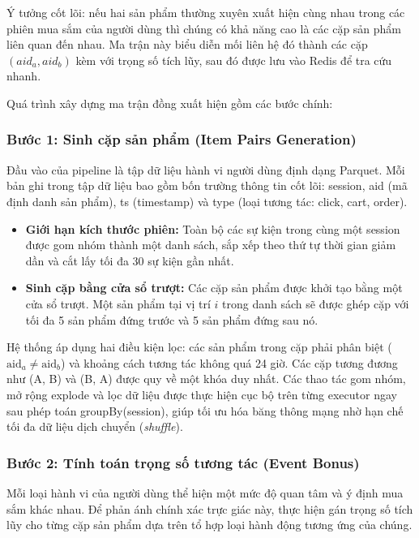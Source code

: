 \documentclass[../BTL.tex]{subfiles}
\begin{document}
Ý tưởng cốt lõi: nếu hai sản phẩm thường xuyên xuất hiện cùng nhau trong các phiên mua sắm của người dùng thì chúng có khả năng cao là các cặp sản phẩm liên quan đến nhau. Ma trận này biểu diễn mối liên hệ đó thành các cặp $(aid_a, aid_b)$ kèm với trọng số tích lũy, sau đó được lưu vào Redis để tra cứu nhanh.

Quá trình xây dựng ma trận đồng xuất hiện gồm các bước chính:

\subsubsection{Bước 1: Sinh cặp sản phẩm (Item Pairs Generation)}

Đầu vào của pipeline là tập dữ liệu hành vi người dùng định dạng Parquet. Mỗi bản ghi trong tập dữ liệu bao gồm bốn trường thông tin cốt lõi: session, aid (mã định danh sản phẩm), ts (timestamp) và type (loại tương tác: click, cart, order).


\begin{itemize}
    \item \textbf{Giới hạn kích thước phiên:} Toàn bộ các sự kiện trong cùng một session được gom nhóm thành một danh sách, sắp xếp theo thứ tự thời gian giảm dần và cắt lấy tối đa 30 sự kiện gần nhất.
    \item \textbf{Sinh cặp bằng cửa sổ trượt:} Các cặp sản phẩm được khởi tạo bằng một cửa sổ trượt. Một sản phẩm tại vị trí $i$ trong danh sách sẽ được ghép cặp với tối đa 5 sản phẩm đứng trước và 5 sản phẩm đứng sau nó.
\end{itemize}

Hệ thống áp dụng hai điều kiện lọc: các sản phẩm trong cặp phải phân biệt ($\text{aid}_a \neq \text{aid}_b$) và khoảng cách tương tác không quá 24 giờ. Các cặp tương đương như (A, B) và (B, A) được quy về một khóa duy nhất. Các thao tác gom nhóm, mở rộng explode và lọc dữ liệu được thực hiện cục bộ trên từng executor ngay sau phép toán groupBy(session), giúp tối ưu hóa băng thông mạng nhờ hạn chế tối đa dữ liệu dịch chuyển (\textit{shuffle}).

\subsubsection{Bước 2: Tính toán trọng số tương tác (Event Bonus)}

Mỗi loại hành vi của người dùng thể hiện một mức độ quan tâm và ý định mua sắm khác nhau. Để phản ánh chính xác trực giác này, thực hiện gán trọng số tích lũy cho từng cặp sản phẩm dựa trên tổ hợp loại hành động tương ứng của chúng.
\end{document}
